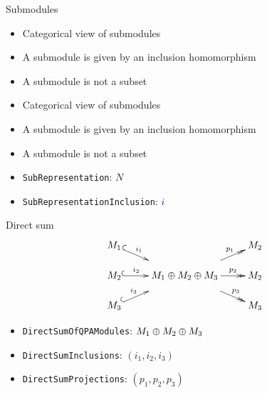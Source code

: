 \begin{frame}[fragile]{Submodules}{}
\begin{overprint}
\begin{itemize}
\item Categorical view of submodules
\item A submodule is given by an inclusion homomorphism
\item A submodule is not a subset
\end{itemize}
\begin{itemize}
\item Categorical view of submodules
\item A submodule is given by an inclusion homomorphism
\item A submodule is not a subset
\item \texttt{SubRepresentation}: \textcolor{BrickRed}{$N$}
\item \texttt{SubRepresentationInclusion}: \textcolor{blue}{$i$}
\end{itemize}
\end{overprint}
\end{frame}


\begin{frame}{Direct sum}
\[
\xymatrix@R=.5em{
M_1 \ar@{^{(}->}[dr]^-{i_1} &&
M_2 \\
M_2 \ar@{^{(}->}[r]^-{i_2} &
{\rule[-10pt]{0pt}{30pt} M_1 \dsum M_2 \dsum M_3} 
\ar@{->>}[ur]^-{p_1}
\ar@{->>}[r]^-{p_2}
\ar@{->>}[dr]^-{p_3}
&
M_2 \\
M_3 \ar@{^{(}->}[ur]^-{i_3} &&
M_3
}
\]
\begin{itemize}
\item \texttt{DirectSumOfQPAModules}: $M_1 \oplus M_2 \oplus M_3$
\item \texttt{DirectSumInclusions}: $(i_1, i_2, i_3)$
\item \texttt{DirectSumProjections}: $(p_1, p_2, p_3)$
\end{itemize}
\end{frame}

